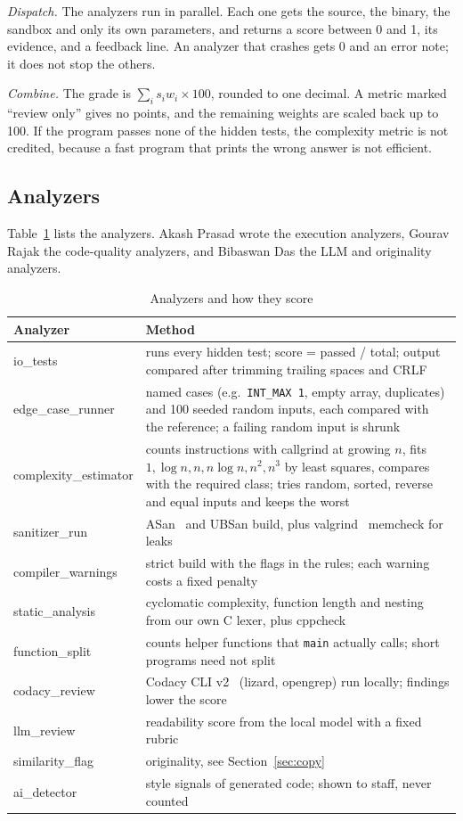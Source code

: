 \documentclass[conference]{IEEEtran}
\newcommand{\code}[1]{\texttt{#1}}
\begin{document}
\emph{Dispatch.} The analyzers run in parallel. Each one gets the source, the binary, the
sandbox and only its own parameters, and returns a score between 0 and 1, its evidence, and a
feedback line. An analyzer that crashes gets 0 and an error note; it does not stop the others.

\emph{Combine.} The grade is $\sum_i s_i w_i \times 100$, rounded to one decimal. A metric marked
``review only'' gives no points, and the remaining weights are scaled back up to 100. If the
program passes none of the hidden tests, the complexity metric is not credited, because a fast
program that prints the wrong answer is not efficient.

\subsection{Analyzers}
Table~\ref{tab:an} lists the analyzers. Akash Prasad wrote the execution analyzers, Gourav Rajak
the code-quality analyzers, and Bibaswan Das the LLM and originality analyzers.

\begin{table}[!t]
\caption{Analyzers and how they score}\label{tab:an}
\centering\footnotesize
\begin{tabular}{@{}>{\raggedright\arraybackslash}p{}>{\raggedright\arraybackslash}p{}@{}}
\toprule
Analyzer & Method \\
\midrule
io\_tests & runs every hidden test; score = passed / total; output compared after trimming trailing spaces and CRLF \\
edge\_case\_runner & named cases (e.g.\ \code{INT\_MAX 1}, empty array, duplicates) and 100 seeded random inputs, each compared with the reference; a failing random input is shrunk \\
complexity\_estimator & counts instructions with callgrind at growing $n$, fits $1,\log n,n,n\log n,n^2,n^3$ by least squares, compares with the required class; tries random, sorted, reverse and equal inputs and keeps the worst \\
sanitizer\_run & ASan~\cite{serebryany2012} and UBSan build, plus valgrind~\cite{nethercote2007} memcheck for leaks \\
compiler\_warnings & strict build with the flags in the rules; each warning costs a fixed penalty \\
static\_analysis & cyclomatic complexity, function length and nesting from our own C lexer, plus cppcheck \\
function\_split & counts helper functions that \code{main} actually calls; short programs need not split \\
codacy\_review & Codacy CLI v2~\cite{codacy} (lizard, opengrep) run locally; findings lower the score \\
llm\_review & readability score from the local model with a fixed rubric \\
similarity\_flag & originality, see Section~\ref{sec:copy} \\
ai\_detector & style signals of generated code; shown to staff, never counted \\
\bottomrule
\end{tabular}
\end{table}
\end{document}
